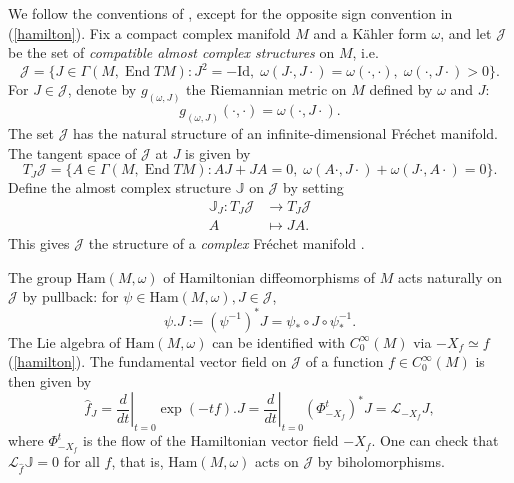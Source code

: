 \documentclass[12pt,reqno,a4paper]{amsart}
\numberwithin{equation}{section}
\DeclareMathOperator{\End}{End}
\theoremstyle{definition}
\theoremstyle{remark}
\begin{document}
We follow the conventions of \cite[Section 1.3]{scarpa2020hitchin}, except for the opposite sign convention in (\ref{hamilton}). Fix a compact complex manifold $M$ and a K\"ahler form $\omega$, and let $\mathcal{J}$ be the set of \textit{compatible almost complex structures} on $M$, i.e.
\begin{equation*}
\mathcal{J}=\{ J\in \Gamma(M,\End TM):J^2=-\mathrm{Id},\; \omega(J\cdot,J\cdot)=\omega(\cdot,\cdot),\; \omega(\cdot,J\cdot)>0 \}.
\end{equation*}
For $J\in\mathcal{J}$, denote by $g_{(\omega,J)}$ the Riemannian metric on $M$ defined by $\omega$ and $J$:
\begin{equation*}
g_{(\omega,J)}(\cdot,\cdot)=\omega(\cdot,J\cdot).
\end{equation*}
The set $\mathcal{J}$ has the natural structure of an infinite-dimensional Fr\'echet manifold. The tangent space of $\mathcal{J}$ at $J$ is given by
\begin{equation*}
T_J \mathcal{J}=\{A\in \Gamma(M,\End TM):AJ+JA=0,\;\omega(A\cdot,J\cdot)+\omega(J\cdot,A\cdot)=0 \}.
\end{equation*}
Define the almost complex structure $\mathbb{J}$ on $\mathcal{J}$ by setting
\begin{align*}
\mathbb{J}_J : T_J \mathcal{J}&\rightarrow T_J \mathcal{J}\\
 A &\mapsto JA.
\end{align*}
This gives $\mathcal{J}$ the structure of a \textit{complex} Fr\'echet manifold \cite{koiso1990complex}.

The group $\mathrm{Ham}(M,\omega)$ of Hamiltonian diffeomorphisms of $M$ acts naturally on $\mathcal{J}$ by pullback: for $\psi\in \mathrm{Ham}(M,\omega), J\in \mathcal{J}$,
\begin{equation}\label{actofham}
\psi.J:=(\psi^{-1})^* J=\psi_*\circ J \circ \psi^{-1}_*. 
\end{equation}
The Lie algebra of $\mathrm{Ham}(M,\omega)$ can be identified with $C^\infty_0(M)$ via $-X_f \simeq f$ (\ref{hamilton}). The fundamental vector field on $\mathcal{J}$ of a function $f\in C^\infty_0(M)$ is then given by
\begin{equation}\label{infaction}
\widehat{f}_J=\left.\frac{d}{dt}\right|_{t=0}\exp(-tf).J=\left.\frac{d}{dt}\right|_{t=0}\left(\Phi^{t}_{-X_f} \right)^*J=\mathcal{L}_{-X_f}J,
\end{equation}
where $\Phi^t_{-X_f}$ is the flow of the Hamiltonian vector field $-X_f$. One can check that $\mathcal{L}_{\widehat{f}}\mathbb{J}=0$ for all $f$, that is, $\mathrm{Ham}(M,\omega)$ acts on $\mathcal{J}$ by biholomorphisms.
\end{document}

